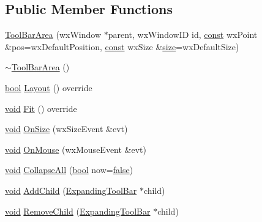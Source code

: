 \subsection*{Public Member Functions}
\begin{DoxyCompactItemize}
\item 
\hyperlink{class_tool_bar_area_af420fb2286fbcb6c96c53a739fd87fa7}{Tool\+Bar\+Area} (wx\+Window $\ast$parent, wx\+Window\+ID id, \hyperlink{getopt1_8c_a2c212835823e3c54a8ab6d95c652660e}{const} wx\+Point \&pos=wx\+Default\+Position, \hyperlink{getopt1_8c_a2c212835823e3c54a8ab6d95c652660e}{const} wx\+Size \&\hyperlink{group__lavu__mem_ga854352f53b148adc24983a58a1866d66}{size}=wx\+Default\+Size)
\item 
\hyperlink{class_tool_bar_area_ad1c07893fa5739a50a2db5da2f11e056}{$\sim$\+Tool\+Bar\+Area} ()
\item 
\hyperlink{mac_2config_2i386_2lib-src_2libsoxr_2soxr-config_8h_abb452686968e48b67397da5f97445f5b}{bool} \hyperlink{class_tool_bar_area_af1c54a29da0b6bc8b90751cbf8cdc877}{Layout} () override
\item 
\hyperlink{sound_8c_ae35f5844602719cf66324f4de2a658b3}{void} \hyperlink{class_tool_bar_area_aba9f30fbabe9d5eebc706de6cd892bf1}{Fit} () override
\item 
\hyperlink{sound_8c_ae35f5844602719cf66324f4de2a658b3}{void} \hyperlink{class_tool_bar_area_ad843ce5619d35db1a661f4abcb4b9ccb}{On\+Size} (wx\+Size\+Event \&evt)
\item 
\hyperlink{sound_8c_ae35f5844602719cf66324f4de2a658b3}{void} \hyperlink{class_tool_bar_area_a9088efc42b1bbd30acc094e43cdf580b}{On\+Mouse} (wx\+Mouse\+Event \&evt)
\item 
\hyperlink{sound_8c_ae35f5844602719cf66324f4de2a658b3}{void} \hyperlink{class_tool_bar_area_a819575a20b95d99d93d6b4f7ed184db4}{Collapse\+All} (\hyperlink{mac_2config_2i386_2lib-src_2libsoxr_2soxr-config_8h_abb452686968e48b67397da5f97445f5b}{bool} now=\hyperlink{mac_2config_2i386_2lib-src_2libsoxr_2soxr-config_8h_a65e9886d74aaee76545e83dd09011727}{false})
\item 
\hyperlink{sound_8c_ae35f5844602719cf66324f4de2a658b3}{void} \hyperlink{class_tool_bar_area_a99688f49717aaf34377252b1c19c5008}{Add\+Child} (\hyperlink{class_expanding_tool_bar}{Expanding\+Tool\+Bar} $\ast$child)
\item 
\hyperlink{sound_8c_ae35f5844602719cf66324f4de2a658b3}{void} \hyperlink{class_tool_bar_area_ae314e806d0f8b7b9299abc5df01eae76}{Remove\+Child} (\hyperlink{class_expanding_tool_bar}{Expanding\+Tool\+Bar} $\ast$child)

\end{DoxyCompactItemize}
